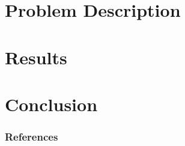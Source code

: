 \documentclass[9pt]{beamer}
\begin{document}
\section{Problem Description}


\section{Results}


\section{Conclusion}



\begin{frame}[allowframebreaks]
  \frametitle{References}
  
  {\footnotesize  }

\end{frame}

\end{document}
